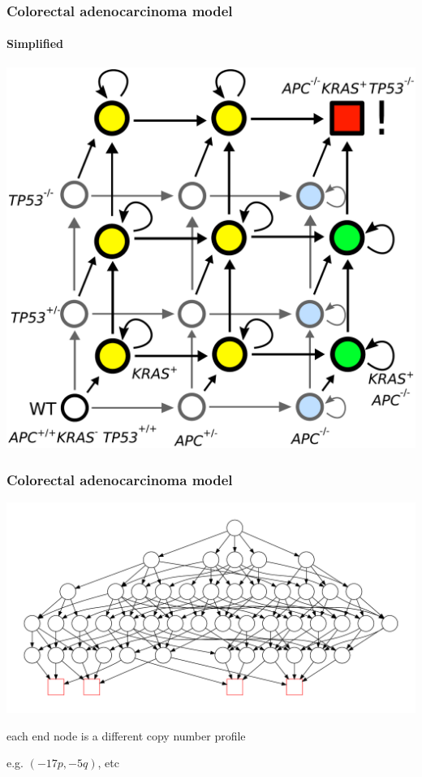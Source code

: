 \documentclass{beamer}
\begin{document}
\begin{frame}
    \frametitle{Colorectal adenocarcinoma model}
    \framesubtitle{Simplified}

    \begin{center}
        \includegraphics[height=0.8\textheight]{figures/cubegraph4-3}
    \end{center}
\end{frame}

\begin{frame}
    \frametitle{Colorectal adenocarcinoma model}
    \begin{center}
        \includegraphics[width=1.0\textwidth]{figures/diagram6}
    \end{center}


    \begin{center}
        \small{each end node is a different copy number profile}

        \;

        \small{e.g. $(-17p, -5q)$, etc}
    \end{center}
\end{frame}
\end{document}
